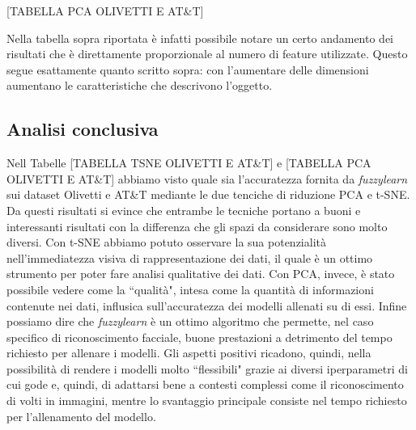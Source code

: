 \documentclass[12pt,italian]{report}
\begin{document}
[TABELLA PCA OLIVETTI E AT\&T]

Nella tabella sopra riportata è infatti possibile notare un certo andamento dei risultati che è direttamente proporzionale al numero di feature utilizzate. Questo segue esattamente quanto scritto sopra: con l'aumentare delle dimensioni aumentano le caratteristiche che descrivono l'oggetto.

\subsection{Analisi conclusiva}
Nell Tabelle [TABELLA TSNE OLIVETTI E AT\&T] e [TABELLA PCA OLIVETTI E AT\&T] abbiamo visto quale sia l'accuratezza fornita da \emph{fuzzylearn} sui dataset Olivetti e AT\&T mediante le due tenciche di riduzione PCA e t-SNE. Da questi risultati si evince che entrambe le tecniche portano a buoni e interessanti risultati con la differenza che gli spazi da considerare sono molto diversi. Con t-SNE abbiamo potuto osservare la sua potenzialità nell'immediatezza visiva di rappresentazione dei dati, il quale è un ottimo strumento per poter fare analisi qualitative dei dati. Con PCA, invece, è stato possibile vedere come la ``qualità", intesa come la quantità di informazioni contenute nei dati, influsica sull'accuratezza dei modelli allenati su di essi. Infine possiamo dire che \emph{fuzzylearn} è un ottimo algoritmo che permette, nel caso specifico di riconoscimento facciale, buone prestazioni a detrimento del tempo richiesto per allenare i modelli. Gli aspetti positivi ricadono, quindi, nella possibilità di rendere i modelli molto ``flessibili" grazie ai diversi iperparametri di cui gode e, quindi, di adattarsi bene a contesti complessi come il riconoscimento di volti in immagini, mentre lo svantaggio principale consiste nel tempo richiesto per l'allenamento del modello.
\end{document}
